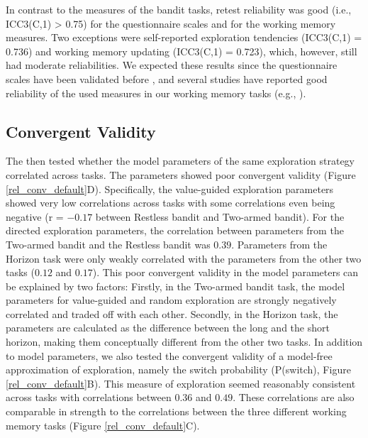 \documentclass[fleqn,10pt]{wlscirep}
\begin{document}
In contrast to the measures of the bandit tasks, retest reliability was good (i.e., ICC3(C,1) > 0.75) for the questionnaire scales and for the working memory measures. Two exceptions were self-reported exploration tendencies (ICC3(C,1) = 0.736) and working memory updating (ICC3(C,1) = 0.723), which, however, still had moderate reliabilities. We expected these results since the questionnaire scales have been validated before \cite{kashdan2004curiosity, soto2017short, ree2008distinguishing, kroenke2001phq, watson1988development}, and several studies have reported good reliability of the used measures in our working memory tasks (e.g., \cite{oswald_development_2015, von_bastian_no_2016, wilhelm_what_2013}).

    
\subsection*{Convergent Validity}

The then tested whether the model parameters of the same exploration strategy correlated across tasks. The  parameters showed poor convergent validity (Figure \ref{rel_conv_default}D). Specifically, the value-guided exploration parameters showed very low correlations across tasks with some correlations even being negative (r = $-0.17$ between Restless bandit and Two-armed bandit). For the directed exploration parameters, the correlation between parameters from the Two-armed bandit and the Restless bandit was $0.39$. Parameters from the Horizon task were only weakly correlated with the parameters from the other two tasks ($0.12$ and $0.17$). This poor convergent validity in the model parameters can be explained by two factors: Firstly, in the Two-armed bandit task, the model parameters for value-guided and random exploration are strongly negatively correlated and traded off with each other. Secondly, in the Horizon task, the parameters are calculated as the difference between the long and the short horizon, making them conceptually different from the other two tasks. In addition to model parameters, we also tested the convergent validity of a model-free approximation of exploration, namely the switch probability (P(switch), Figure \ref{rel_conv_default}B). This measure of exploration seemed reasonably consistent across tasks with correlations between $0.36$ and $0.49$. These correlations are also comparable in strength to the correlations between the three different working memory tasks (Figure \ref{rel_conv_default}C).
\end{document}
